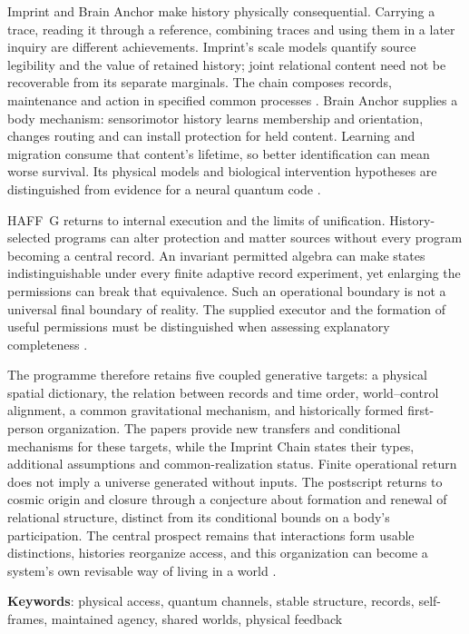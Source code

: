 \documentclass[12pt,a4paper]{article}
\begin{document}
Imprint and Brain Anchor make history physically consequential. Carrying a trace, reading it through a reference, combining traces and using them in a later inquiry are different achievements. Imprint's scale models quantify source legibility and the value of retained history; joint relational content need not be recoverable from its separate marginals. The chain composes records, maintenance and action in specified common processes \cite{Imprint}. Brain Anchor supplies a body mechanism: sensorimotor history learns membership and orientation, changes routing and can install protection for held content. Learning and migration consume that content's lifetime, so better identification can mean worse survival. Its physical models and biological intervention hypotheses are distinguished from evidence for a neural quantum code \cite{Brain}.

HAFF~G returns to internal execution and the limits of unification. History-selected programs can alter protection and matter sources without every program becoming a central record. An invariant permitted algebra can make states indistinguishable under every finite adaptive record experiment, yet enlarging the permissions can break that equivalence. Such an operational boundary is not a universal final boundary of reality. The supplied executor and the formation of useful permissions must be distinguished when assessing explanatory completeness \cite{HAFFG}.

The programme therefore retains five coupled generative targets: a physical spatial dictionary, the relation between records and time order, world--control alignment, a common gravitational mechanism, and historically formed first-person organization. The papers provide new transfers and conditional mechanisms for these targets, while the Imprint Chain states their types, additional assumptions and common-realization status. Finite operational return does not imply a universe generated without inputs. The postscript returns to cosmic origin and closure through a conjecture about formation and renewal of relational structure, distinct from its conditional bounds on a body's participation. The central prospect remains that interactions form usable distinctions, histories reorganize access, and this organization can become a system's own revisable way of living in a world \cite{Imprint,HAFFPS}.

\bigskip
\noindent\textbf{Keywords}: physical access, quantum channels, stable structure, records, self-frames, maintained agency, shared worlds, physical feedback
\end{document}
